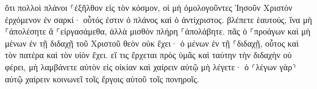 \documentclass{openreader}
\begin{document}
ὅτι πολλοὶ πλάνοι ⸀ἐξῆλθον εἰς τὸν κόσμον, οἱ μὴ ὁμολογοῦντες Ἰησοῦν Χριστὸν ἐρχόμενον ἐν σαρκί· οὗτός ἐστιν ὁ πλάνος καὶ ὁ ἀντίχριστος. βλέπετε ἑαυτούς, ἵνα μὴ ⸀ἀπολέσητε ἃ ⸀εἰργασάμεθα, ἀλλὰ μισθὸν πλήρη ⸀ἀπολάβητε. πᾶς ὁ ⸀προάγων καὶ μὴ μένων ἐν τῇ διδαχῇ τοῦ Χριστοῦ θεὸν οὐκ ἔχει· ὁ μένων ἐν τῇ ⸀διδαχῇ, οὗτος καὶ τὸν πατέρα καὶ τὸν υἱὸν ἔχει. εἴ τις ἔρχεται πρὸς ὑμᾶς καὶ ταύτην τὴν διδαχὴν οὐ φέρει, μὴ λαμβάνετε αὐτὸν εἰς οἰκίαν καὶ χαίρειν αὐτῷ μὴ λέγετε· ὁ ⸂λέγων γὰρ⸃ αὐτῷ χαίρειν κοινωνεῖ τοῖς ἔργοις αὐτοῦ τοῖς πονηροῖς. 
\end{document}
